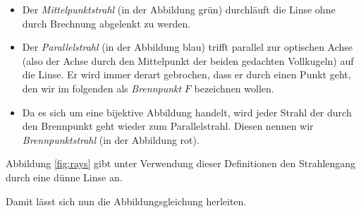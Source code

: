 \documentclass[a4paper,german,12pt,smallheadings]{scrartcl}
\begin{document}
\begin{itemize}
  \item Der \textit{Mittelpunktstrahl} (in der Abbildung grün) durchläuft die
    Linse ohne durch Brechnung abgelenkt zu werden.
  \item Der \textit{Parallelstrahl} (in der Abbildung blau) trifft parallel zur
    optischen Achse (also der Achse durch den Mittelpunkt der beiden gedachten
    Vollkugeln) auf die Linse. Er wird immer derart gebrochen, dass er durch
    einen Punkt geht, den wir im folgenden als \textit{Brennpunkt} $F$
    bezeichnen wollen.
  \item Da es sich um eine bijektive Abbildung handelt, wird jeder Strahl der
    durch den Brennpunkt geht wieder zum Parallelstrahl. Diesen nennen wir
    \textit{Brennpunktstrahl} (in der Abbildung rot).
\end{itemize}

Abbildung \ref{fig:rays} gibt unter Verwendung dieser Definitionen den Strahlengang durch
eine dünne Linse an.

Damit lässt sich nun die Abbildungsgleichung herleiten.
\end{document}
